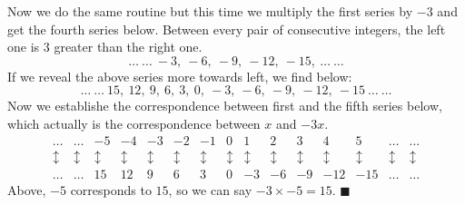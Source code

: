 \documentclass{article}
\begin{document}
Now we do the same routine but this time we multiply the first series by $-3$ and get the fourth series below. Between every pair of consecutive integers, the left one is $3$ greater than the right one.
\begin{equation}
	\ldots\ \ldots\ -3,\ -6,\ -9,\ -12,\ -15, \ \ldots\ \ldots
\end{equation}
If we reveal the above series more towards left, we find below:
\begin{equation}
	\ldots\ \ldots\ 15,\ 12,\ 9,\ 6,\ 3,\ 0,\ -3,\ -6,\ -9,\ -12,\ -15\ \ldots\ \ldots
\end{equation}
Now we establishe the correspondence between first and the fifth series below, which actually is the correspondence between $x$ and $-3x$. 
\[
\begin{array}{rrrrrrrrrrrrrrr}
\ldots & \ldots & -5 & -4 & -3 & -2 & -1 & 0 & 1 & 2 & 3 & 4 & 5 & \ldots & \ldots\\
\updownarrow & \updownarrow & \updownarrow & \updownarrow & \updownarrow & \updownarrow & \updownarrow & \updownarrow & \updownarrow & \updownarrow & \updownarrow & \updownarrow & \updownarrow & \updownarrow & \updownarrow\\
\ldots & \ldots & 15 & 12 & 9 & 6 & 3 & 0 & -3 & -6 & -9 & -12 & -15 & \ldots & \ldots
\end{array}
\]
Above, $-5$ corresponds to $15$, so we can say $-3 \times -5 = 15$. $\blacksquare$
\end{document}
